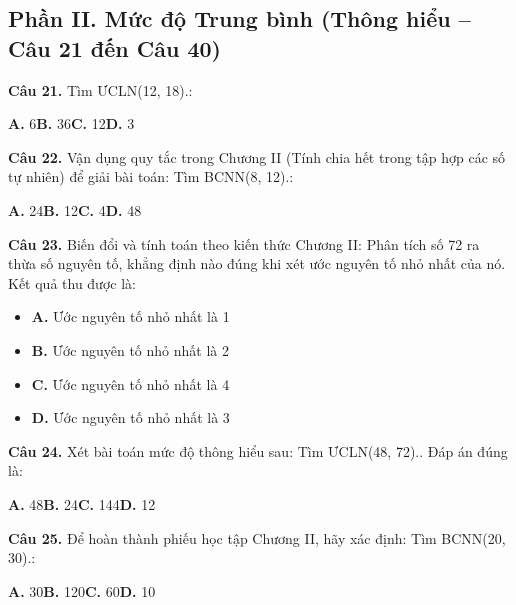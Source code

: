 \documentclass[11pt,a4paper]{article}
\begin{document}
\subsection*{\color{accent} Phần II. Mức độ Trung bình (Thông hiểu -- Câu 21 đến Câu 40)}
\textbf{\color{primary} Câu 21.} Tìm ƯCLN(12, 18).:\par
\hspace*{1.5em}\textbf{A.} 6\quad\quad \textbf{B.} 36\quad\quad \textbf{C.} 12\quad\quad \textbf{D.} 3\par\vspace{2pt}
\textbf{\color{primary} Câu 22.} Vận dụng quy tắc trong Chương II (Tính chia hết trong tập hợp các số tự nhiên) để giải bài toán: Tìm BCNN(8, 12).:\par
\hspace*{1.5em}\textbf{A.} 24\quad\quad \textbf{B.} 12\quad\quad \textbf{C.} 4\quad\quad \textbf{D.} 48\par\vspace{2pt}
\textbf{\color{primary} Câu 23.} Biến đổi và tính toán theo kiến thức Chương II: Phân tích số 72 ra thừa số nguyên tố, khẳng định nào đúng khi xét ước nguyên tố nhỏ nhất của nó. Kết quả thu được là:\par
\begin{itemize}\setlength{\itemsep}{1pt}\setlength{\parskip}{0pt}
  \item[] \textbf{A.} Ước nguyên tố nhỏ nhất là 1
  \item[] \textbf{B.} Ước nguyên tố nhỏ nhất là 2
  \item[] \textbf{C.} Ước nguyên tố nhỏ nhất là 4
  \item[] \textbf{D.} Ước nguyên tố nhỏ nhất là 3
\end{itemize}\vspace{2pt}
\textbf{\color{primary} Câu 24.} Xét bài toán mức độ thông hiểu sau: Tìm ƯCLN(48, 72).. Đáp án đúng là:\par
\hspace*{1.5em}\textbf{A.} 48\quad\quad \textbf{B.} 24\quad\quad \textbf{C.} 144\quad\quad \textbf{D.} 12\par\vspace{2pt}
\textbf{\color{primary} Câu 25.} Để hoàn thành phiếu học tập Chương II, hãy xác định: Tìm BCNN(20, 30).:\par
\hspace*{1.5em}\textbf{A.} 30\quad\quad \textbf{B.} 120\quad\quad \textbf{C.} 60\quad\quad \textbf{D.} 10\par\vspace{2pt}
\end{document}
